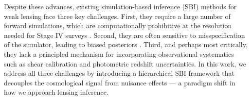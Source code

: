 Despite these advances, existing simulation-based inference (SBI) methods for weak lensing face three key challenges. First, they require a large number of forward simulations, which are computationally prohibitive at the resolution needed for Stage IV surveys \citep{jeffrey2021, fluri2022}. Second, they are often sensitive to misspecification of the simulator, leading to biased posteriors \citep{cannon2022}. Third, and perhaps most critically, they lack a principled mechanism for incorporating observational systematics such as shear calibration and photometric redshift uncertainties. In this work, we address all three challenges by introducing a hierarchical SBI framework that decouples the cosmological signal from nuisance effects — a paradigm shift in how we approach lensing inference.
